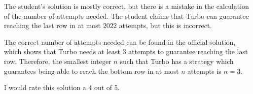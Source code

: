 The student's solution is mostly correct, but there is a mistake in the calculation of the number of attempts needed. The student claims that Turbo can guarantee reaching the last row in at most $2022$ attempts, but this is incorrect.

The correct number of attempts needed can be found in the official solution, which shows that Turbo needs at least $3$ attempts to guarantee reaching the last row. Therefore, the smallest integer $n$ such that Turbo has a strategy which guarantees being able to reach the bottom row in at most $n$ attempts is $n = 3$.

I would rate this solution a 4 out of 5.
